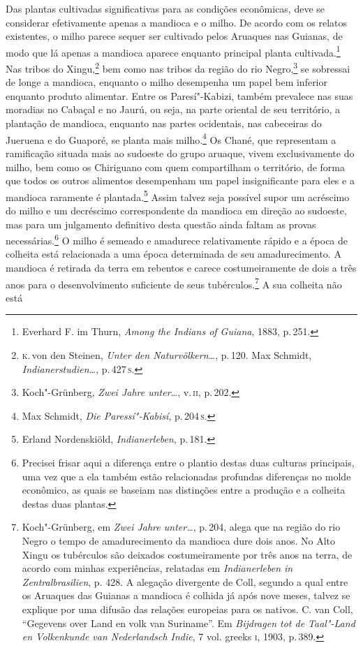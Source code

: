 Das plantas cultivadas significativas para as condições econômicas, deve
se considerar efetivamente apenas a mandioca e o milho. De acordo com
os relatos existentes, o milho parece sequer ser cultivado pelos Aruaques
nas Guianas, de modo que lá apenas a mandioca aparece enquanto principal
planta cultivada.\footnote{Everhard F. im Thurn, \textit{Among the Indians
  of Guiana}, 1883, p.\,251.} Nas tribos do Xingu,\footnote{\textsc{k}.\,von den
  Steinen, \textit{Unter den Naturvölkern\ldots}, p.\,120. Max
  Schmidt, \textit{Indianerstudien\ldots}, p.\,427\,\textsc{s}.} bem
como nas tribos da região do rio Negro,\footnote{Koch"-Grünberg,
  \textit{Zwei Jahre unter\ldots}, v.\,\textsc{ii}, p.\,202.} se sobressai
de longe a mandioca, enquanto o milho desempenha um papel bem inferior
enquanto produto alimentar. Entre os Paresí"-Kabizi, também prevalece nas
suas moradias no Cabaçal e no Jaurú, ou seja, na parte oriental de seu
território, a plantação de mandioca, enquanto nas partes ocidentais, nas
cabeceiras do Jueruena e do Guaporé, se planta mais milho.\footnote{Max
  Schmidt, \textit{Die Paressí"-Kabisí}, p.\,204\,\textsc{s}.} Os Chané, que
representam a ramificação situada mais ao sudoeste do grupo aruaque,
vivem exclusivamente do milho, bem como os Chiriguano com quem compartilham 
o território, de forma que todos os outros alimentos
desempenham um papel insignificante para eles e a mandioca raramente é
plantada.\footnote{Erland Nordenskiöld, \textit{Indianerleben}, p.\,181.} Assim talvez seja possível supor um
acréscimo do milho e um decréscimo correspondente da mandioca em direção
ao sudoeste, mas para um julgamento definitivo desta questão ainda
faltam as provas necessárias.\footnote{Precisei frisar aqui a diferença entre o
plantio destas duas culturas principais, uma vez que a ela também estão
relacionadas profundas diferenças no molde econômico, as quais se
baseiam nas distinções entre a produção e a colheita destas duas
plantas.} O milho é semeado e amadurece relativamente rápido e a época de
colheita está relacionada a uma época determinada de seu amadurecimento.
A mandioca é retirada da terra em rebentos e carece costumeiramente de
dois a três anos para o desenvolvimento suficiente de seus
tubérculos.\footnote{Koch"-Grünberg, em \textit{Zwei Jahre unter\ldots}, p.\,204, alega que na região do rio Negro o tempo de
  amadurecimento da mandioca dure dois anos. No Alto Xingu os tubérculos
  são deixados costumeiramente por três anos na terra, de acordo com
  minhas experiências, relatadas em \textit{Indianerleben in Zentralbrasilien}, p.
  428. A alegação divergente de Coll, segundo a qual entre os Aruaques
  das Guianas a mandioca é colhida já após nove meses, talvez se
  explique por uma difusão das relações europeias para os nativos. C.
  van Coll, ``Gegevens over Land en volk van Suriname''. Em
  \textit{Bijdragen tot de Taal"-Land en Volkenkunde van Nederlandsch
  Indie}, 7 vol. greeks \textsc{i}, 1903, p.\,389.} A sua colheita não está
